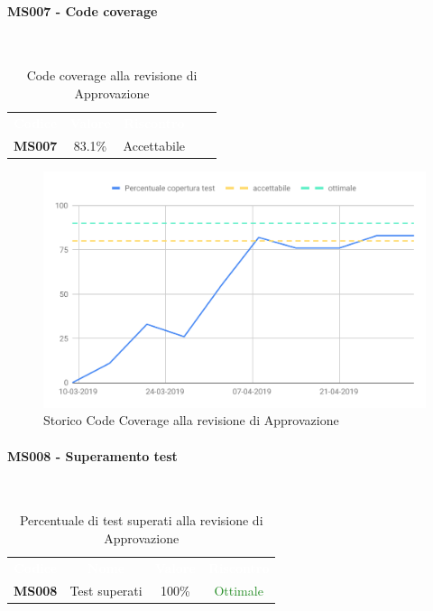\paragraph{MS007 - Code coverage}\mbox{}\\[0,3cm]
    \begin{table}[H]
        \centering
        \begin{tabular}{ccccc}
            \rowcolor{greySWEight}
            \textcolor{white}{\textbf{Codice}} &
            \textcolor{white}{\textbf{Valore}}&
            \textcolor{white}{\textbf{Riscontro}}\\
            \textbf{MS007} & 83.1\% & \textcolor{YellowOrange}{Accettabile}\\
        \end{tabular}
        \caption{Code coverage alla revisione di Approvazione}
    \end{table}
    \begin{figure}[H]
        \centering
        \includegraphics[width=145mm]{sez/App_Esito/Approvazione/graph/CodeCoverage.pdf}
        \caption{Storico Code Coverage alla revisione di Approvazione}
    \end{figure}

\paragraph{MS008 - Superamento test}\mbox{}\\[0,3cm]
    \begin{table}[H]
        \centering
        \begin{tabular}{cccc}
        \rowcolor{greySWEight}
        \textcolor{white}{\textbf{Codice}} &
        \textcolor{white}{\textbf{Nome}} &
        \textcolor{white}{\textbf{Valore}} &
        \textcolor{white}{\textbf{Riscontro}}\\
        \textbf{MS008}& Test superati & 100\% & \textcolor{ForestGreen}{Ottimale} \\

        \end{tabular}
        \caption{Percentuale di test superati alla revisione di Approvazione}
    \end{table}

